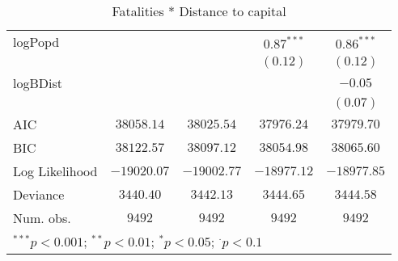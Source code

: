 \begin{sidewaystable}
\begin{center}
{\begin{tabular}{l c c c c}
logPopd              &               &               & $0.87^{***}$   & $0.86^{***}$   \\
                     &               &               & $(0.12)$       & $(0.12)$       \\
logBDist             &               &               &                & $-0.05$        \\
                     &               &               &                & $(0.07)$       \\
\midrule
AIC                  & $38058.14$    & $38025.54$    & $37976.24$     & $37979.70$     \\
BIC                  & $38122.57$    & $38097.12$    & $38054.98$     & $38065.60$     \\
Log Likelihood       & $-19020.07$   & $-19002.77$   & $-18977.12$    & $-18977.85$    \\
Deviance             & $3440.40$     & $3442.13$     & $3444.65$      & $3444.58$      \\
Num. obs.            & $9492$        & $9492$        & $9492$         & $9492$         \\
\bottomrule
\multicolumn{5}{l}{\scriptsize{$^{***}p<0.001$; $^{**}p<0.01$; $^{*}p<0.05$; $^{\cdot}p<0.1$}}
\end{tabular}
}
\caption{Fatalities * Distance to capital}
\label{interaction_interdeaths}
\end{center}
\end{sidewaystable}
